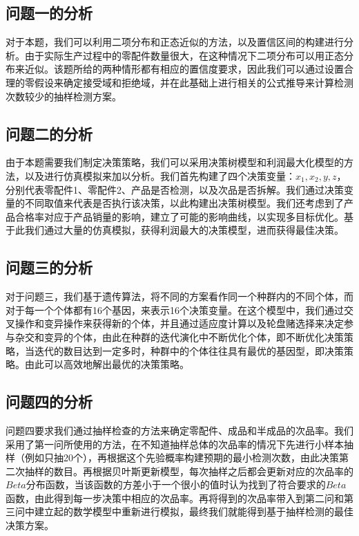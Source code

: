 \documentclass[utf8]{ctexart} %
\begin{document}
		\subsection{问题一的分析}
		对于本题，我们可以利用二项分布和正态近似的方法，以及置信区间的构建进行分析。由于实际生产过程中的零配件数量很大，在这种情况下二项分布可以用正态分布来近似。该题所给的两种情形都有相应的置信度要求，因此我们可以通过设置合理的零假设来确定接受域和拒绝域，并在此基础上进行相关的公式推导来计算检测次数较少的抽样检测方案。
		\subsection{问题二的分析}
		由于本题需要我们制定决策策略，我们可以采用决策树模型和利润最大化模型的方法，以及进行仿真模拟来加以分析。我们首先构建了四个决策变量：$x_1,x_2,y,z$，分别代表零配件1、零配件2、产品是否检测，以及次品是否拆解。我们通过决策变量的不同取值来代表是否执行该决策，以此构建出决策树模型。我们还考虑到了产品合格率对应于产品销量的影响，建立了可能的影响曲线，以实现多目标优化。基于此我们通过大量的仿真模拟，获得利润最大的决策模型，进而获得最佳决策。
		
		\subsection{问题三的分析}
		对于问题三，我们基于遗传算法，将不同的方案看作同一个种群内的不同个体，而对于每一个个体都有16个基因，来表示16个决策变量。在这个模型中，我们通过交叉操作和变异操作来获得新的个体，并且通过适应度计算以及轮盘赌选择来决定参与杂交和变异的个体，由此在种群的迭代演化中不断优化个体，即不断优化决策策略，当迭代的数目达到一定多时，种群中的个体往往具有最优的基因型，即决策策略。由此可以高效地解出最优的决策策略。
		\subsection{问题四的分析}
		问题四要求我们通过抽样检查的方法来确定零配件、成品和半成品的次品率。我们采用了第一问所使用的方法，在不知道抽样总体的次品率的情况下先进行小样本抽样（例如只抽20个），再根据这个先验概率构建预期的最小检测次数，由此决策第二次抽样的数目。再根据贝叶斯更新模型，每次抽样之后都会更新对应的次品率的$Beta$分布函数，当该函数的方差小于一个很小的值时认为找到了符合要求的$Beta$函数，由此得到每一步决策中相应的次品率。再将得到的次品率带入到第二问和第三问中建立起的数学模型中重新进行模拟，最终我们就能得到基于抽样检测的最佳决策方案。
\end{document}
